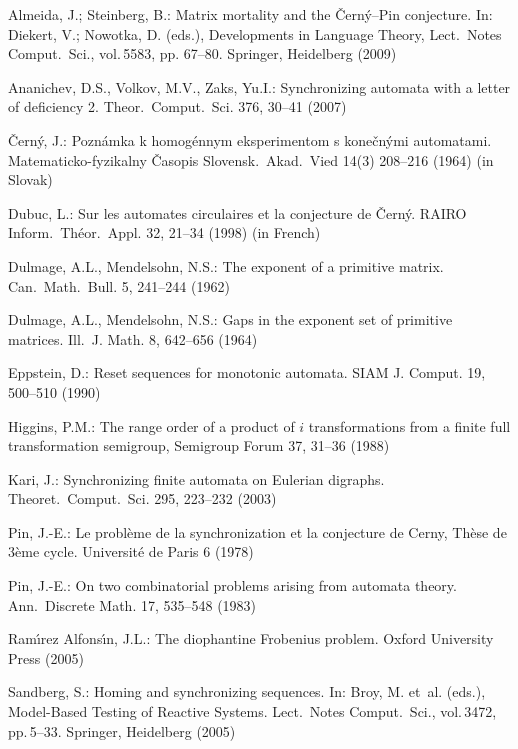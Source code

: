 \documentclass[11pt]{llncs}
\begin{document}
\begin{thebibliography}{99}
Almeida, J.; Steinberg, B.: Matrix mortality and the \v{C}ern\'{y}--Pin
conjecture. In:  Diekert, V.; Nowotka, D. (eds.), Developments in
Language Theory, Lect.\ Notes Comput.\ Sci., vol.\,5583, pp. 67--80.
Springer, Heidelberg (2009)

Ananichev, D.S., Volkov, M.V., Zaks, Yu.I.: Synchronizing automata
with a letter of deficiency 2. Theor.\ Comput.\ Sci. 376, 30--41 (2007)

\v{C}ern\'{y}, J.: Pozn\'{a}mka k homog\'{e}nnym eksperimentom s
kone\v{c}n\'{y}mi automatami. Matematicko-fyzikalny \v{C}asopis
Slovensk.\ Akad.\ Vied 14(3) 208--216 (1964) (in Slovak)

Dubuc, L.: Sur les automates circulaires et la conjecture de
\v{C}ern\'y. RAIRO Inform.\ Th\'eor.\ Appl. 32, 21--34 (1998) (in
French)

Dulmage, A.L., Mendelsohn, N.S.: The exponent of a primitive matrix.
Can.\ Math.\ Bull. 5, 241--244 (1962)

Dulmage, A.L., Mendelsohn, N.S.: Gaps in the exponent set of primitive
matrices. Ill.\ J. Math. 8, 642--656 (1964)

Eppstein, D.: Reset sequences for monotonic automata. SIAM J.
Comput. 19, 500--510 (1990)

Higgins, P.M.: The range order of a product of $i$ transformations
from a finite full transformation semigroup, Semigroup Forum 37, 31--36
(1988)

Kari, J.: Synchronizing finite automata on Eulerian digraphs.
Theoret.\ Comput.\ Sci. 295, 223--232 (2003)

Pin, J.-E.: Le probl\`eme de la synchronization et la conjecture de
Cerny, Th\`ese de 3\`eme cycle. Universit\'e de Paris 6 (1978)

Pin, J.-E.: On two combinatorial problems arising from automata
theory. Ann.\ Discrete Math. 17, 535--548 (1983)

Ram\'{\i}rez Alfons\'{\i}n, J.L.: The diophantine Frobenius problem.
Oxford University Press (2005)

Sandberg, S.: Homing and synchronizing sequences. In: Broy, M.
et~al. (eds.), Model-Based Testing of Reactive Systems. Lect.\
Notes Comput.\ Sci., vol.\,3472, pp.\,5--33. Springer, Heidelberg
(2005)


\end{thebibliography}
\end{document}
